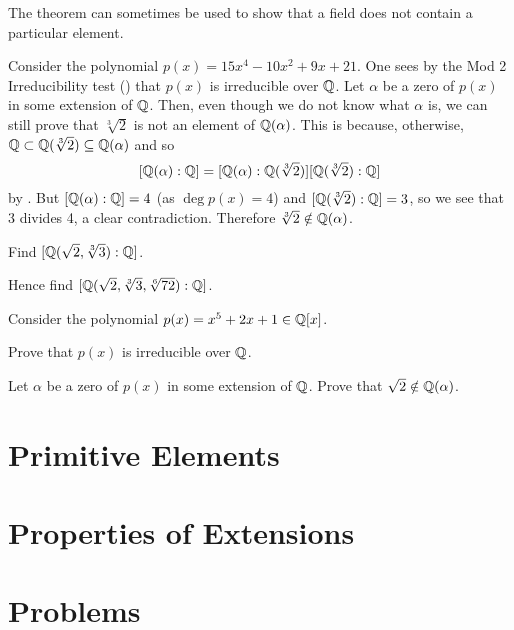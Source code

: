 The theorem can sometimes be used to show that a field does not contain a particular element.

\begin{example}
    Consider the polynomial $p(x) = 15x^4 - 10x^2 + 9x + 21$. One sees by the Mod 2 Irreducibility test () that $p(x)$ is irreducible over $\mathbb{Q}$. Let $\alpha$ be a zero of $p(x)$ in some extension of $\mathbb{Q}$. Then, even though we do not know what $\alpha$ is, we can still prove that $\sqrt[3]2$ is not an element of $\mathbb{Q}(\alpha)$. This is because, otherwise, $\mathbb{Q} \subset \mathbb{Q}(\sqrt[3]2) \subseteq \mathbb{Q}(\alpha)$ and so
    \[
        [\mathbb{Q}(\alpha):\mathbb{Q}] = [\mathbb{Q}(\alpha):\mathbb{Q}(\sqrt[3]2)][\mathbb{Q}(\sqrt[3]2):\mathbb{Q}]
    \]
    by . But $[\mathbb{Q}(\alpha):\mathbb{Q}] = 4$ (as $\deg p(x) = 4$) and $[\mathbb{Q}(\sqrt[3]2):\mathbb{Q}] = 3$, so we see that 3 divides 4, a clear contradiction. Therefore $\sqrt[3]2 \notin \mathbb{Q}(\alpha)$.
\end{example}

\begin{exercise}
    \hfill
    \begin{partquestions}{\alph*}
        \item \begin{partquestions}{\roman*}
            \item Find $[\mathbb{Q}(\sqrt2,\sqrt[3]3):\mathbb{Q}]$.
            \item Hence find $[\mathbb{Q}(\sqrt2, \sqrt[3]3, \sqrt[6]{72}):\mathbb{Q}]$.
        \end{partquestions}
        \item Consider the polynomial $p(x) = x^5 + 2x + 1 \in \mathbb{Q}[x]$.
        \begin{partquestions}{\roman*}
            \item Prove that $p(x)$ is irreducible over $\mathbb{Q}$.
            \item Let $\alpha$ be a zero of $p(x)$ in some extension of $\mathbb{Q}$. Prove that $\sqrt2 \notin \mathbb{Q}(\alpha)$.
        \end{partquestions}
    \end{partquestions}
\end{exercise}

\section{Primitive Elements}

\section{Properties of Extensions}

\newpage

\section{Problems}
